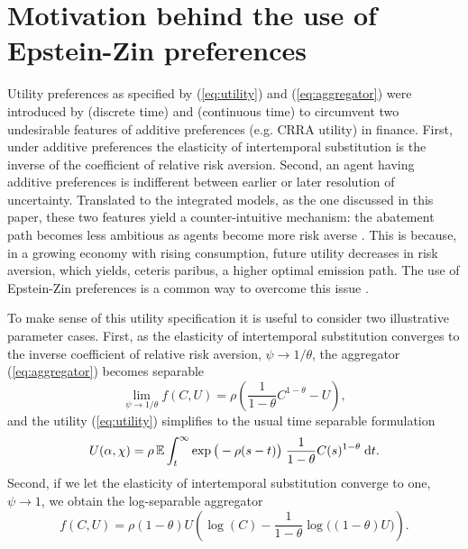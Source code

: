 \documentclass[../../main.tex]{subfiles}
\begin{document}
\section{Motivation behind the use of Epstein-Zin preferences} \label{appendix:epstein-zin}

Utility preferences as specified by (\ref{eq:utility}) and (\ref{eq:aggregator}) were introduced by \citep{epstein_substitution_1989} (discrete time) and \citep{duffie_asset_1992} (continuous time) to circumvent two undesirable features of additive preferences (e.g. CRRA utility) in finance. First, under additive preferences the elasticity of intertemporal substitution is the inverse of the coefficient of relative risk aversion. Second, an agent having additive preferences is indifferent between earlier or later resolution of uncertainty. Translated to the integrated models, as the one discussed in this paper, these two features yield a counter-intuitive mechanism: the abatement path becomes less ambitious as agents become more risk averse \citep{pindyck_economic_2013}. This is because, in a growing economy with rising consumption, future utility decreases in risk aversion, which yields, ceteris paribus, a higher optimal emission path. The use of Epstein-Zin preferences is a common way to overcome this issue \citep{pindyck_economic_2013, crost_optimal_2013, ackerman_epsteinzin_2013, hambel_optimal_2021,  olijslagers_discounting_2019}.

To make sense of this utility specification it is useful to consider two illustrative parameter cases. First, as the elasticity of intertemporal substitution converges to the inverse  coefficient of relative risk aversion, $\psi \to 1 / \theta$, the aggregator (\ref{eq:aggregator}) becomes separable \begin{equation}
    \lim_{\psi \to 1 / \theta} f(C, U) = \rho \left(\frac{1}{1 - \theta} C^{1 - \theta} - U\right),
\end{equation} and the utility (\ref{eq:utility}) simplifies to the usual time separable formulation \begin{equation}
    U(\alpha, \chi) = \rho\operatorname{\mathbb{E}} \int^{\infty}_t \exp\big(-\rho (s - t) \big) \; \frac{1}{1 - \theta} C(s)^{1 - \theta} \; \mathrm{d}t.
\end{equation} Second, if we let the elasticity of intertemporal substitution converge to one, $\psi \to 1$, we obtain the log-separable aggregator \begin{equation} \label{eq:epstein-zin:log-separable}
    f(C, U) = \rho (1 - \theta)U \left(\log(C) - \frac{1}{1 - \theta} \log\big( (1 - \theta) U \big) \right).
\end{equation}
\end{document}
